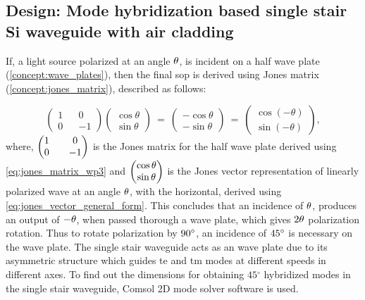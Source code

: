 \documentclass[../report.tex]{subfiles}
\begin{document}
		\subsection{Design: Mode hybridization based single stair Si waveguide with air cladding}

If, a light source polarized at an angle $\mathrm{\theta}$, is incident on a half wave plate (\ref{concept:wave_plates}), then the final \gls{sop} is derived using Jones matrix (\ref{concept:jones_matrix}), described as follows:

\begin{equation}\label{eq:wave_plate_pr}
\left( \begin{matrix} 1& & 0\\ 0& & -1\end{matrix} \right) \left( \begin{matrix} \cos \theta \\ \sin \theta \end{matrix} \right) ~ = ~ \left( \begin{matrix} -\cos \theta \\ -\sin \theta \end{matrix}\right) ~ = ~ \left( \begin{matrix} \cos \left(-\theta\right) \\ \sin \left(-\theta\right) \end{matrix} \right), 
\end{equation}
where, $\mathrm{\left( \begin{matrix} 1& & 0\\ 0& & -1\end{matrix} \right)}$ is the Jones matrix for the half wave plate derived using \ref{eq:jones_matrix_wp3} and $\mathrm{\left( \begin{matrix} \cos \theta \\ \sin \theta \end{matrix} \right)}$ is the Jones vector representation of linearly polarized wave at an angle $\mathrm{\theta}$, with the horizontal, derived using \ref{eq:jones_vector_general_form}. This concludes that an incidence of $\mathrm{\theta}$, produces an output of $\mathrm{-\theta}$, when passed thorough a wave plate, which gives $\mathrm{2\theta}$ polarization rotation. Thus to rotate polarization by $\mathrm{90{^\circ}}$, an incidence of $\mathrm{45{^\circ}}$ is necessary on the wave plate. The single stair waveguide acts as an wave plate due to its asymmetric structure which guides \gls{te} and \gls{tm} modes at different speeds in different axes. To find out the dimensions for obtaining $45{^\circ}$ hybridized modes in the single stair waveguide, Comsol 2D mode solver software is used. 
\end{document}
